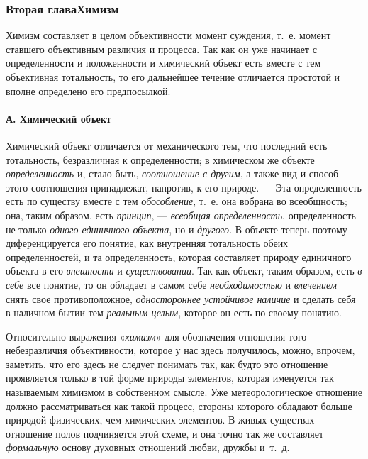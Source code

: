 \documentclass[twoside]{article}
\begin{document}
{{{\subsubsection[Вторая глава Химизм]{Вторая глава\newline Химизм}
Химизм составляет в целом объективности момент суждения, т.~е.
момент ставшего объективным различия и процесса. Так как он уже начинает с
определенности и положенности и химический объект есть вместе с тем
объективная тотальность, то его дальнейшее течение отличается простотой и
вполне определено его предпосылкой.

\paragraph[А. Химический объект]{А. Химический объект}
Химический объект отличается от механического тем, что
последний есть тотальность, безразличная к определенности; в химическом же
объекте {\em определенность}
и, стало быть,
{\em соотношение с другим},
а также вид и способ этого соотношения принадлежат, напротив,
к его природе. — Эта определенность есть по существу вместе
с тем {\em обособление},
т.~е. она вобрана во всеобщность; она, таким образом, есть
{\em принцип}, —
{\em всеобщая определенность},
определенность не только
{\em одного единичного объекта},
но и {\em другого}.
В объекте теперь поэтому диференцируется его понятие, как
внутренняя тотальность обеих определенностей, и та определенность, которая
составляет природу единичного объекта в его
{\em внешности} и
{\em существовании}. Так
как объект, таким образом, есть {\em в
себе} все понятие, то он обладает в самом себе
{\em необходимостью} и
{\em влечением} снять
свое противоположное, {\em одностороннее
устойчивое наличие} и сделать себя в наличном бытии тем
{\em реальным целым},
которое он есть по своему понятию.

Относительно выражения
«{\em химизм}» для
обозначения отношения того небезразличия объективности, которое у нас здесь
получилось, можно, впрочем, заметить, что его здесь не следует понимать
так, как будто это отношение проявляется только в той форме природы
элементов, которая именуется так называемым химизмом в собственном смысле.
Уже метеорологическое отношение должно рассматриваться как такой процесс,
стороны которого обладают больше природой физических, чем химических
элементов. В живых существах отношение полов подчиняется этой схеме, и она
точно так же составляет
{\em формальную} основу
духовных отношений любви, дружбы
и~т.~д.~\label{bkm:bm81}

}}}
\end{document}
